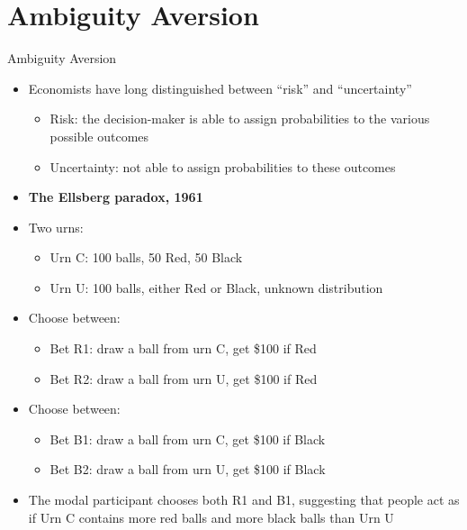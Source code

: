 \documentclass[aspectratio=169, 11pt]{beamer}
\begin{document}
\section{Ambiguity Aversion}

\begin{frame}[shrink=5]{Ambiguity Aversion}
\begin{itemize}
\item Economists have long distinguished between ``risk'' and ``uncertainty''
  \begin{itemize}
  \item Risk: the decision-maker is able to assign probabilities to the various possible outcomes
  \item Uncertainty: not able to assign probabilities to these outcomes
  \end{itemize}
\item \textbf{The Ellsberg paradox, 1961}
\item Two urns:
  \begin{itemize}
  \item Urn C: 100 balls, 50 Red, 50 Black
  \item Urn U: 100 balls, either Red or Black, unknown distribution
  \end{itemize}
\item Choose between:
  \begin{itemize}
  \item Bet R1: draw a ball from urn C, get \$100 if Red
  \item Bet R2: draw a ball from urn U, get \$100 if Red
  \end{itemize}
\item Choose between:
  \begin{itemize}
  \item Bet B1: draw a ball from urn C, get \$100 if Black
  \item Bet B2: draw a ball from urn U, get \$100 if Black
  \end{itemize}
\item The modal participant chooses both R1 and B1, suggesting that people act as if Urn C contains more red balls and more black balls than Urn U
\end{itemize}
\end{frame}
\end{document}
